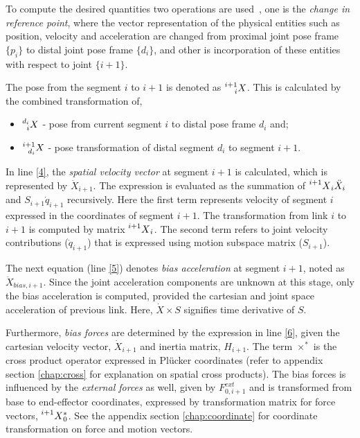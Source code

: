To compute the desired quantities two operations are used~\cite{shakhimardanov2015composable}, one is the \textit{change in reference point}, where the vector representation of the physical entities such as position, velocity and acceleration are changed from proximal joint pose frame $\{p_i\}$ to distal joint pose frame $\{d_i\}$, and other is incorporation of these entities with respect to joint $\{i+1\}$.

The pose from the segment $i$ to $i+1$ is denoted as $\prescript{i+1}{i}{X}$. This is calculated by the combined transformation of,\begin{itemize}
	\item $\prescript{d_i}{i}{X}$ - pose from current segment $i$ to distal pose frame $d_i$ and;
	\item $\prescript{i+1}{d_i}{X}$ - pose transformation of distal segment $d_i$ to segment $i+1$. 
\end{itemize} 

In line \ref{4}, the \textit{spatial velocity vector} at segment $i+1$ is calculated, which is represented by $\ddot{X}_{i+1}$. The expression is evaluated as the summation of $\prescript{i+1}{}{X}_i\ddot{X}_i$ and  $S_{i+1}\dot{q}_{i+1}$ recursively. Here the first term represents velocity of segment $i$ expressed in the coordinates of segment $i+1$. The transformation from link $i$ to $i+1$ is computed by matrix $\prescript{i+1}{}{X}_{i}$. The second term refers to joint velocity contributions ($\dot{q}_{i+1}$) that is expressed using motion subspace matrix ($S_{i+1}$).

The next equation (line \ref{5}) denotes \textit{bias acceleration} at segment $i+1$, noted as $\ddot{X}_{bias, i+1}$. Since the joint acceleration components are unknown at this stage, only the bias acceleration is computed, provided the cartesian and joint space acceleration of previous link. Here, $\dot{X} \times S$ signifies time derivative of $S$. 

Furthermore, \textit{bias forces} are determined by the expression in line \ref{6}, given the cartesian velocity vector, $\dot{X}_{i+1}$ and inertia matrix, $H_{i+1}$. The term $\times^*$ is the cross product operator expressed in Pl{\"u}cker coordinates (refer to appendix section \ref{chap:cross} for explanation on spatial cross products). The bias forces is influenced by the \textit{external forces} as well, given by $F^{ext}_{0, i+1}$ and is transformed from base to end-effector coordinates, expressed by transformation matrix for force vectors, $\prescript{i+1}{}{X}_0^*$. See the appendix section \ref{chap:coordinate} for coordinate transformation on force and motion vectors.

